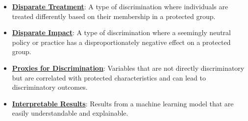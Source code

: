 \documentclass{article}%
\begin{document}
\begin{itemize}[leftmargin=*]
\item \href{https://purdue.brightspace.com/d2l/common/assets/pdfjs-d2l-dist/1.0.14-legacy/web/viewer.html?file=\%2Fcontent\%2Fenforced\%2F1095467-wl.202510.CS.24300.001\%2F16L2-ethics.pdf\%3Fou\%3D1095467\&lang=en-us\&container=d2l-fileviewer-rendered-pdf\&fullscreen=d2l-fileviewer-rendered-pdf-dialog\&height=667#page=19}{\textbf{Disparate Treatment}}: A type of discrimination where individuals are treated differently based on their membership in a protected group.%
\item \href{https://purdue.brightspace.com/d2l/common/assets/pdfjs-d2l-dist/1.0.14-legacy/web/viewer.html?file=\%2Fcontent\%2Fenforced\%2F1095467-wl.202510.CS.24300.001\%2F16L2-ethics.pdf\%3Fou\%3D1095467\&lang=en-us\&container=d2l-fileviewer-rendered-pdf\&fullscreen=d2l-fileviewer-rendered-pdf-dialog\&height=667#page=19}{\textbf{Disparate Impact}}: A type of discrimination where a seemingly neutral policy or practice has a disproportionately negative effect on a protected group.%
\item \href{https://purdue.brightspace.com/d2l/common/assets/pdfjs-d2l-dist/1.0.14-legacy/web/viewer.html?file=\%2Fcontent\%2Fenforced\%2F1095467-wl.202510.CS.24300.001\%2F16L2-ethics.pdf\%3Fou\%3D1095467\&lang=en-us\&container=d2l-fileviewer-rendered-pdf\&fullscreen=d2l-fileviewer-rendered-pdf-dialog\&height=667#page=13}{\textbf{Proxies for Discrimination}}: Variables that are not directly discriminatory but are correlated with protected characteristics and can lead to discriminatory outcomes.%
\item \href{https://purdue.brightspace.com/d2l/common/assets/pdfjs-d2l-dist/1.0.14-legacy/web/viewer.html?file=\%2Fcontent\%2Fenforced\%2F1095467-wl.202510.CS.24300.001\%2F16L2-ethics.pdf\%3Fou\%3D1095467\&lang=en-us\&container=d2l-fileviewer-rendered-pdf\&fullscreen=d2l-fileviewer-rendered-pdf-dialog\&height=667#page=28}{\textbf{Interpretable Results}}: Results from a machine learning model that are easily understandable and explainable.%
\end{itemize}

%
\end{document}
